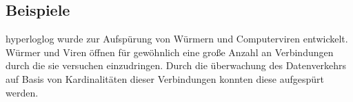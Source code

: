 \subsection{Beispiele}
hyperloglog wurde zur Aufspürung von Würmern und Computerviren entwickelt. 
Würmer und Viren öffnen für gewöhnlich eine große Anzahl an Verbindungen durch die sie versuchen einzudringen. 
Durch die überwachung des Datenverkehrs auf Basis von Kardinalitäten dieser Verbindungen konnten diese aufgespürt werden. \cite{flajolet2007}